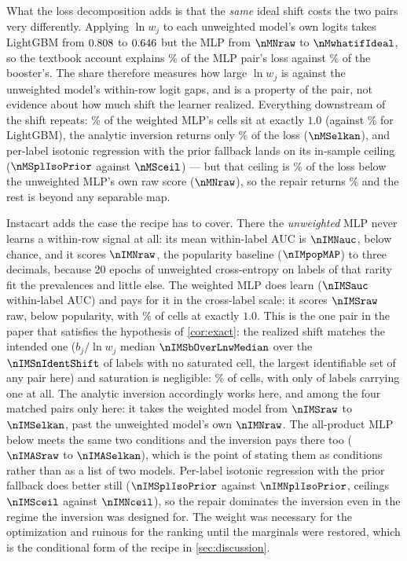 \documentclass[sigconf,nonacm]{acmart}
\begin{document}
What the loss decomposition adds is that the \emph{same} ideal shift costs the two pairs very differently. Applying $\ln w_j$ to each unweighted model's own logits takes LightGBM from $0.808$ to $0.646$ but the MLP from $\nMNraw$ to $\nMwhatifIdeal$, so the textbook account explains \nModdsShare\% of the MLP pair's loss against \noddsShare\% of the booster's. The share therefore measures how large $\ln w_j$ is against the unweighted model's within-row logit gaps, and is a property of the pair, not evidence about how much shift the learner realized. Everything downstream of the shift repeats: \nMSsatOne\% of the weighted MLP's cells sit at exactly $1.0$ (against \nSsatOne\% for LightGBM), the analytic inversion returns only \nMelkanShare\% of the loss ($\nMSelkan$), and per-label isotonic regression with the prior fallback lands on its in-sample ceiling ($\nMSplIsoPrior$ against $\nMSceil$) --- but that ceiling is \nMtieShare\% of the loss below the unweighted MLP's own raw score ($\nMNraw$), so the repair returns \nMrepairShare\% and the rest is beyond any separable map.

Instacart adds the case the recipe has to cover. There the \emph{unweighted} MLP never learns a within-row signal at all: its mean within-label AUC is $\nIMNauc$, below chance, and it scores $\nIMNraw$, the popularity baseline ($\nIMpopMAP$) to three decimals, because 20 epochs of unweighted cross-entropy on \nInLabels{} labels of that rarity fit the prevalences and little else. The weighted MLP does learn ($\nIMSauc$ within-label AUC) and pays for it in the cross-label scale: it scores $\nIMSraw$ raw, below popularity, with \nIMSsatOne\% of cells at exactly $1.0$. This is the one pair in the paper that satisfies the hypothesis of \cref{cor:exact}: the realized shift matches the intended one ($b_j/\ln w_j$ median $\nIMSbOverLnwMedian$ over the $\nIMSnIdentShift$ of \nInLabels{} labels with no saturated cell, the largest identifiable set of any pair here) and saturation is negligible: \nIMSsatOne\% of cells, with only \nIMSnSatDroppedShift{} of \nInLabels{} labels carrying one at all. The analytic inversion accordingly works here, and among the four matched pairs only here: it takes the weighted model from $\nIMSraw$ to $\nIMSelkan$, past the unweighted model's own $\nIMNraw$. The all-product MLP below meets the same two conditions and the inversion pays there too ($\nIMASraw$ to $\nIMASelkan$), which is the point of stating them as conditions rather than as a list of two models. Per-label isotonic regression with the prior fallback does better still ($\nIMSplIsoPrior$ against $\nIMNplIsoPrior$, ceilings $\nIMSceil$ against $\nIMNceil$), so the repair dominates the inversion even in the regime the inversion was designed for. The weight was necessary for the optimization and ruinous for the ranking until the marginals were restored, which is the conditional form of the recipe in \cref{sec:discussion}.
\end{document}
